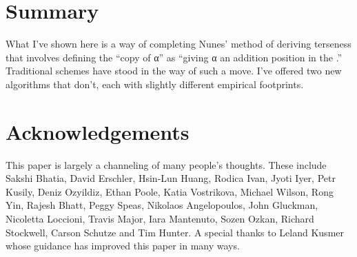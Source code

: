 \documentclass[output=paper]{langsci/langscibook}
\begin{document}

\section{Summary} %
\label{sec:30.summary}

What I've shown here is a way of completing Nunes' method of deriving terseness
that involves defining the ``copy of α'' as ``giving α an addition position in
the .'' Traditional  schemes have stood in the
way of such a move. I've offered two new  algorithms that
don't, each with slightly different empirical footprints.



\printchapterglossary{}

\section*{Acknowledgements}

This paper is largely a channeling of many people's thoughts. These include
Sakshi Bhatia, David Erschler, Hsin-Lun Huang, Rodica Ivan, Jyoti Iyer, Petr
Kusily, Deniz Ozyildiz, Ethan Poole, Katia Vostrikova, Michael Wilson, Rong
Yin, Rajesh Bhatt, Peggy Speas, Nikolaos Angelopoulos, John Gluckman, Nicoletta
Loccioni, Travis Major, Iara Mantenuto, Sozen Ozkan, Richard Stockwell, Carson
Schutze and Tim Hunter. A special thanks to Leland Kusmer whose guidance has
improved this paper in many ways.

{\sloppy
\printbibliography[heading=subbibliography,notkeyword=this]
}
\end{document}
